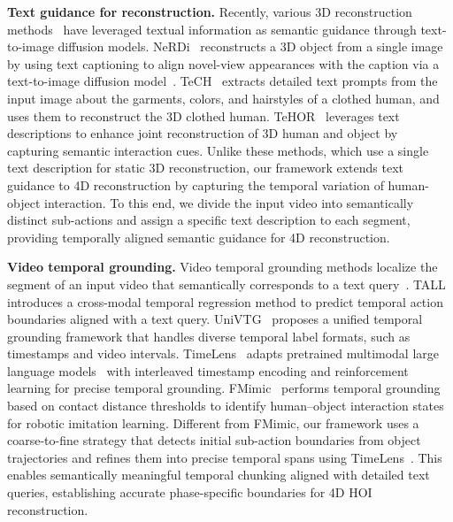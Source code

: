 \noindent\textbf{Text guidance for reconstruction.}
Recently, various 3D reconstruction methods~\cite{deng2023nerdi,huang2024tech,tang2023make,ye2024ghop,tang2024dreamgaussian,sun2024dreamcraft3d,qian2024magic123,wang2024animatabledreamer,nam2026tehor,kim2025david} have leveraged textual information as semantic guidance through text-to-image diffusion models.
NeRDi~\cite{deng2023nerdi} reconstructs a 3D object from a single image by using text captioning to align novel-view appearances with the caption via a text-to-image diffusion model~\cite{rombach2022high}.
TeCH~\cite{huang2024tech} extracts detailed text prompts from the input image about the garments, colors, and hairstyles of a clothed human, and uses them to reconstruct the 3D clothed human.
TeHOR~\cite{nam2026tehor} leverages text descriptions to enhance joint reconstruction of 3D human and object by capturing semantic interaction cues.
Unlike these methods, which use a single text description for static 3D reconstruction, our framework extends text guidance to 4D reconstruction by capturing the temporal variation of human-object interaction.
To this end, we divide the input video into semantically distinct sub-actions and assign a specific text description to each segment, providing temporally aligned semantic guidance for 4D reconstruction.


\noindent\textbf{Video temporal grounding.}
Video temporal grounding methods localize the segment of an input video that semantically corresponds to a text query~\cite{gao2017tall,zhang2020learning,lei2021moment,moon2023query,lin2023univtg,ren2024timechat,huang2024vtimellm,wang2024groundedvideollm,chen2025fmimic,zhang2026timelens}.
TALL~\cite{gao2017tall} introduces a cross-modal temporal regression method to predict temporal action boundaries aligned with a text query.
UniVTG~\cite{lin2023univtg} proposes a unified temporal grounding framework that handles diverse temporal label formats, such as timestamps and video intervals.
TimeLens~\cite{zhang2026timelens} adapts pretrained multimodal large language models~\cite{bai2025qwen3} with interleaved timestamp encoding and reinforcement learning for precise temporal grounding.
FMimic~\cite{chen2025fmimic} performs temporal grounding based on contact distance thresholds to identify human--object interaction states for robotic imitation learning.
Different from FMimic, our framework uses a coarse-to-fine strategy that detects initial sub-action boundaries from object trajectories and refines them into precise temporal spans using TimeLens~\cite{zhang2026timelens}.
This enables semantically meaningful temporal chunking aligned with detailed text queries, establishing accurate phase-specific boundaries for 4D HOI reconstruction.